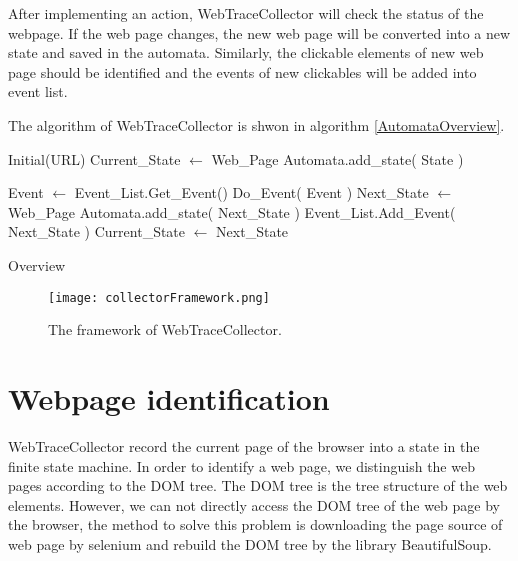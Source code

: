 After implementing an action, WebTraceCollector will check the status of the webpage.
If the web page changes, the new web page will be converted into a new state and saved in the automata.
Similarly, the clickable elements of new web page should be identified and 
the events of new clickables will be added into event list.

The algorithm of WebTraceCollector is shwon in algorithm \ref{AutomataOverview}.

\begin{algorithm}[htb]
	\begin{doublespace}		
		Initial(URL)\;
		Current\_State $\gets$ Web\_Page\;
		Automata.add\_state( State )\;
				
		{
			Event $\gets$ Event\_List.Get\_Event()\;
			Do\_Event( Event )\;
			Next\_State $\gets$ Web\_Page\;
			{
				Automata.add\_state( Next\_State )\;
				Event\_List.Add\_Event( Next\_State )\;
			}
			Current\_State $\gets$ Next\_State\;
		}		
	\end{doublespace}
	\caption{Overview}
	\label{algorithm:overview}
\end{algorithm} 

\begin{figure}[h]
\graphicspath{{pic/}}
\begin{center}
	\texttt{[image: collectorFramework.png]}
\end{center}
\caption{The framework of WebTraceCollector. }
\label{collectorFramework}
\end{figure}


\clearpage

\section{Webpage identification}

WebTraceCollector record the current page of the browser into a state in the finite state machine.
In order to identify a web page,
we distinguish the web pages according to the DOM tree.
The DOM tree is the tree structure of the web elements.
However, we can not directly access the DOM tree of the web page by the browser,
the method to solve this problem is downloading the page source of web page by selenium 
and rebuild the DOM tree by the library BeautifulSoup\cite{BS4}.

